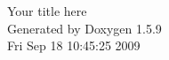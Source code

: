 \documentclass[a4paper]{book}
\begin{document}
\hypersetup{pageanchor=false}
\begin{titlepage}
\vspace*{7cm}
\begin{center}
{\Large Your title here}\\
\vspace*{1cm}
{\large Generated by Doxygen 1.5.9}\\
\vspace*{0.5cm}
{\small Fri Sep 18 10:45:25 2009}\\
\end{center}
\end{titlepage}
\clearemptydoublepage
{}
\tableofcontents
\clearemptydoublepage
{}
\hypersetup{pageanchor=true}
\end{document}
